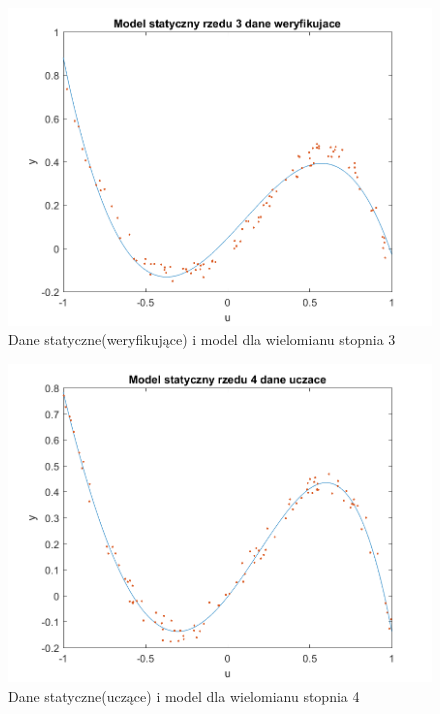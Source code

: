 \documentclass{article}
\begin{document}
\begin{figure}
\centering
\includegraphics[width=0.95\linewidth]{dane_statyczne_model_rzedu_3_weryf}
\caption{Dane statyczne(weryfikujące) i model dla wielomianu stopnia 3}
\label{fig:danestatyczneweryf3}
\end{figure}

\begin{figure}
\centering
\includegraphics[width=0.95\linewidth]{dane_statyczne_model_rzedu_4_uczace}
\caption{Dane statyczne(uczące) i model dla wielomianu stopnia 4}
\label{fig:danestatyczneuczace4}
\end{figure}
\end{document}
